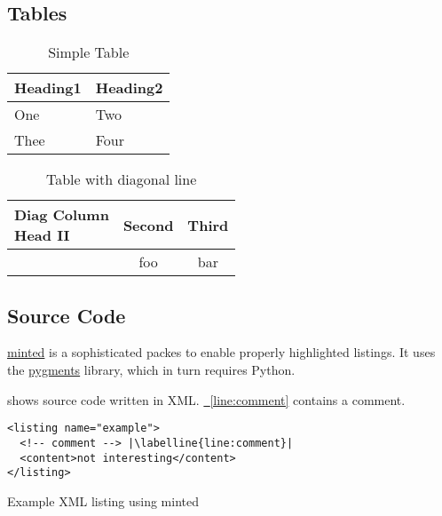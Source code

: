 \documentclass[ngerman,runningheads,a4paper]{llncs}[2018/03/10]
\newcommand{\labelline}[1]{\label[line]{#1}\hypertarget{#1}{}}
\newcommand{\refline}[1]{\hyperlink{#1}{\FancyVerbLineautorefname~\ref*{#1}}}
\begin{document}
\subsection{Tables}

\begin{ltgexample}
\begin{table}
  \caption{Simple Table}
  \label{tab:simple}
  \centering
  \begin{tabular}{ll}
    \toprule
    Heading1 & Heading2 \\
    \midrule
    One      & Two      \\
    Thee     & Four     \\
    \bottomrule
  \end{tabular}
\end{table}
\end{ltgexample}

\begin{ltgexample}
\begin{table}
\caption{Table with diagonal line}
\label{tab:diag}
\begin{center}
\begin{tabular}{|l|c|c|}
\hline
\diagbox[width=10em]{Diag\\Column Head I}{Diag Column\\Head II} & Second & Third \\
\hline
& foo & bar \\
\hline
\end{tabular}
\end{center}
\end{table}
\end{ltgexample}


\subsection{Source Code}

\href{https://github.com/gpoore/minted}{minted} is a sophisticated packes to enable properly highlighted listings.
It uses the \href{http://pygments.org/}{pygments} library, which in turn requires Python.

\begin{ltgexample}
 shows source code written in XML.
\refline{line:comment} contains a comment.

\begin{listing}[htbp]
    \begin{verbatim}
<listing name="example">
  <!-- comment --> |\labelline{line:comment}|
  <content>not interesting</content>
</listing>
\end{verbatim}
  \caption{Example XML listing using minted}
  \label{lst:XML}
\end{listing}
\end{ltgexample}
\end{document}
